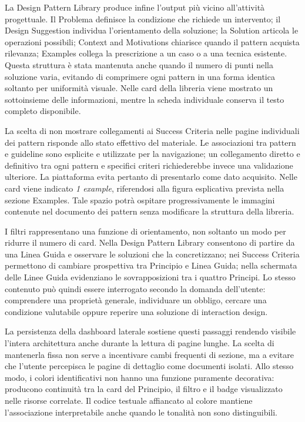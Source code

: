 La Design Pattern Library produce infine l'output più vicino all'attività progettuale. Il Problema definisce la condizione che richiede un intervento; il Design Suggestion individua l'orientamento della soluzione; la Solution articola le operazioni possibili; Context and Motivations chiarisce quando il pattern acquista rilevanza; Examples collega la prescrizione a un caso o a una tecnica esistente. Questa struttura è stata mantenuta anche quando il numero di punti nella soluzione varia, evitando di comprimere ogni pattern in una forma identica soltanto per uniformità visuale. Nelle card della libreria viene mostrato un sottoinsieme delle informazioni, mentre la scheda individuale conserva il testo completo disponibile.

La scelta di non mostrare collegamenti ai Success Criteria nelle pagine individuali dei pattern risponde allo stato effettivo del materiale. Le associazioni tra pattern e guideline sono esplicite e utilizzate per la navigazione; un collegamento diretto e definitivo tra ogni pattern e specifici criteri richiederebbe invece una validazione ulteriore. La piattaforma evita pertanto di presentarlo come dato acquisito. Nelle card viene indicato \emph{1 example}, riferendosi alla figura esplicativa prevista nella sezione Examples. Tale spazio potrà ospitare progressivamente le immagini contenute nel documento dei pattern senza modificare la struttura della libreria.

I filtri rappresentano una funzione di orientamento, non soltanto un modo per ridurre il numero di card. Nella Design Pattern Library consentono di partire da una Linea Guida e osservare le soluzioni che la concretizzano; nei Success Criteria permettono di cambiare prospettiva tra Principio e Linea Guida; nella schermata delle Linee Guida evidenziano le sovrapposizioni tra i quattro Principi. Lo stesso contenuto può quindi essere interrogato secondo la domanda dell'utente: comprendere una proprietà generale, individuare un obbligo, cercare una condizione valutabile oppure reperire una soluzione di interaction design.

La persistenza della dashboard laterale sostiene questi passaggi rendendo visibile l'intera architettura anche durante la lettura di pagine lunghe. La scelta di mantenerla fissa non serve a incentivare cambi frequenti di sezione, ma a evitare che l'utente percepisca le pagine di dettaglio come documenti isolati. Allo stesso modo, i colori identificativi non hanno una funzione puramente decorativa: producono continuità tra la card del Principio, il filtro e il badge visualizzato nelle risorse correlate. Il codice testuale affiancato al colore mantiene l'associazione interpretabile anche quando le tonalità non sono distinguibili.


